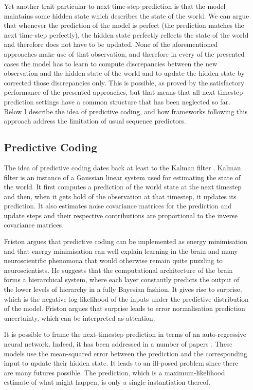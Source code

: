 	Yet another trait particular to next time-step prediction is that the model maintains some hidden state which describes the state of the world. We can argue that whenever the prediction of the model is perfect (the prediction matches the next time-step perfectly), the hidden state perfectly reflects the state of the world and therefore does not have to be updated. None of the aforementioned approaches make use of that observation, and therefore in every of the presented cases the model has to learn to compute discrepancies between the new observation and the hidden state of the world and to update the hidden state by corrected those discrepancies only. This is possible, as proved by the satisfactory performance of the presented approaches, but that means that all next-timestep prediction settings have a common structure that has been neglected so far. Below I describe the idea of predictive coding, and how frameworks following this approach address the limitation of usual sequence predictors.
	
\subsection{Predictive Coding}

	The idea of predictive coding dates back at least to the Kalman filter \addref. Kalman filter is an instance of a Gaussian linear system used for estimating the state of the world. It first computes a prediction of the world state at the next timestep and then, when it gets hold of the observation at that timestep, it updates its prediction. It also estimates noise covariance matrices for the prediction and update steps and their respective contributions are proportional to the inverse covariance matrices. 
	
	Friston \addref argues that predictive coding can be implemented as energy minimisation and that energy minimisation can well explain learning in the brain and many neuroscientific phenomona that would otherwise remain quite puzzling to neuroscientists. He suggests that the computational architecture of the brain forms a hierarchical system, where each layer constantly predicts the output of the lower levels of hierarchy in a fully Bayesian fashion. It gives rise to surprise, which is the negative log-likelihood of the inputs under the predictive distribution of the model. Friston argues that surprise leads to error normalisation \wrt prediction uncertainty, which can be interpreted as attention.
	
	It is possible to frame the next-timestep prediction in terms of an auto-regressive neural network. Indeed, it has been addressed in a number of papers \citep{Lotter2016, Canziani2017}. These models use the mean-squared error between the prediction and the corresponding input to update their hidden state. It leads to an ill-posed problem since there are many futures possible. The prediction, which is a maximum-likelihood estimate of what might happen, is only a single instantiation thereof.
    
